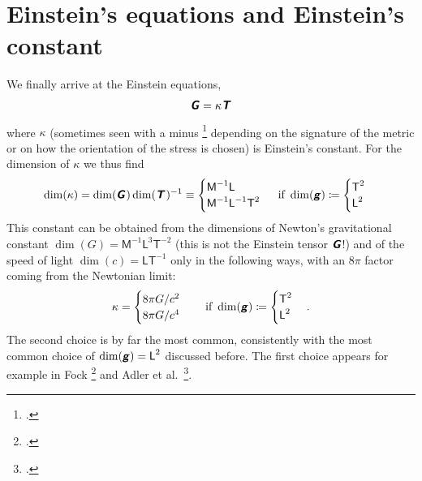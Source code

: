 \documentclass[\ifafour a4paper,12pt,\else a5paper,10pt,\fi%
onecolumn,oneside,article,%
british%
]{memoir}
\makeatletter
\theoremstyle{remark}
\theoremstyle{innote}
\newcommand*{\mathte}[1]{\textbf{\textit{\textsf{#1}}}}
\newcommand*{\citep}{\footcites}
\newcommand*{\defd}{\coloneqq}
\renewcommand*{\|}[1][]{\nonscript\,#1\vert\nonscript\;\mathopen{}}
\newcommand*{\sect}{\S}%
\newcommand*{\eqn}{eq.}%
\newcommand*{\eqns}{eqs}%
\newcommand*{\eg}{{e.g.}}
\newcommand*{\etal}{{et al.}}
\newcommand*{\q}{}%
\DeclareRobustCommand*{\q}{%
  \mathbin{\mathpalette\bigcdot@{}}%
}
\newcommand*{\bigcdot@scalefactor}{0.75}
\newcommand*{\bigcdot@widthfactor}{1.5}
\newcommand*{\bigcdot@}[2]{%
  \sbox0{$#1\vcenter{}$}%
  \sbox2{$#1\cdot\m@th$}%
  \hbox to \bigcdot@widthfactor\wd2{%
    \hfil
    \raise\ht0\hbox{%
      \scalebox{\bigcdot@scalefactor}{%
        \lower\ht0\hbox{$#1\bullet\m@th$}%
      }%
    }%
    \hfil
  }%
}
\newcommand*{\Le}{\textsf{L}}
\newcommand*{\Ti}{\textsf{T}}
\newcommand*{\Ma}{\textsf{M}}
\newcommand*{\yg}{\mathte{g}}
\newcommand*{\yT}{\mathte{T}}
\newcommand*{\yG}{\mathte{G}}
\renewcommand*{\i}{\indices}
\newcommand*{\yk}{\kappa}
\makeatother
\begin{document}
\section{Einstein's equations and Einstein's constant}
\label{sec:einstein_eq}

We finally arrive at the Einstein equations,
\begin{equation}
  \label{eq:einstein}
  \yG%
  = \yk \yT%
\end{equation}
where $\yk$ (sometimes seen with a minus \citep[\eg][\sect~78
\eqn~(78.3)]{tolman1934_t1949}[\sect~52
\eqn~(52.06)]{fock1955_t1964}[\sect~14.2 \eqn~(14.8)]{rindler2001_r2006}
depending on the signature of the metric or on how the orientation of the
stress is chosen) is Einstein's constant. For the dimension of $\yk$ we
thus find
\begin{equation}
  \label{eq:dim_k_1}
  \dim(\yk) = \dim(\yG\i{_{\q}^{\q}})\dim(\yT\i{_{\q}^{\q}})^{-1} \equiv
    \begin{cases}
    \Ma^{-1}\Le \\
    \Ma^{-1}\Le^{-1}\Ti^{2}
  \end{cases}
  \text{ if }\dim(\yg)\defd
  \begin{cases}
     \Ti^2 \\
    \Le^2
  \end{cases}
\end{equation}
This constant can be obtained from the dimensions of Newton's gravitational
constant $\dim(G)=\Ma^{-1}\Le^{3}\Ti^{-2}$ (this is not the Einstein tensor
$\yG$!) and of the speed of light $\dim(c)=\Le\Ti^{-1}$ only in the
following ways, with an $8\pi$ factor coming from the Newtonian limit:
\begin{equation}
  \label{eq:k_Gc}
  \yk =     \begin{cases}
   8\pi G/c^{2} \\
   8\pi G/c^{4}
  \end{cases}
  \quad\text{if }\dim(\yg)\defd
  \begin{cases}
     \Ti^2 \\
    \Le^2
  \end{cases}.
\end{equation}
The second choice is by far the most common, consistently with the most
common choice of $\dim(\yg)=\Le^{2}$ discussed before. The first choice
appears for example in Fock \citep[\sect~55 \eqns~(55.15)
and~(52.06)]{fock1955_t1964} and Adler \etal\ \citep[\sect~10.5
\eqn~(10.98)]{adleretal1965_r1975}.
\end{document}
